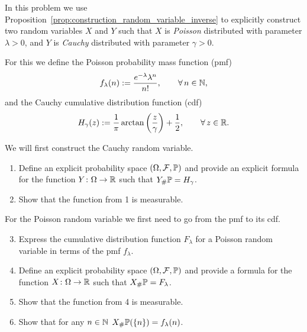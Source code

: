 \begin{problem}
In this problem we use Proposition~\ref{prop:construction_random_variable_inverse} to explicitly construct two random variables $X$ and $Y$ such that $X$ is \emph{Poisson} distributed with parameter $\lambda>0$, and $Y$ is \emph{Cauchy} distributed with parameter $\gamma>0$. 

For this we define the Poisson probability mass function (pmf)
\begin{equation}
	f_\lambda(n) := \frac{e^{-\lambda}\lambda^n}{n!},\qquad \forall\,n\in\mathbb N,
\end{equation}
and the Cauchy cumulative distribution function (cdf)
\begin{equation}
	H_\gamma(z) := \frac{1}{\pi}\arctan\left(\frac{z}{\gamma}\right) + \frac{1}{2},\qquad \forall\,z\in\mathbb R.
\end{equation}

We will first construct the Cauchy random variable.
\begin{enumerate}[label=(\alph*)]
\item Define an explicit probability space $(\Omega, \mathcal F, \mathbb P)$ and provide an explicit formula for the function $Y\colon \Omega\to\mathbb R$ such that $Y_\# \mathbb P = H_\gamma$.
\item Show that the function from 1 is measurable.
\end{enumerate}

For the Poisson random variable we first need to go from the pmf to its cdf.
\begin{enumerate}[label=(\alph*)]
\setcounter{enumi}{2}
\item Express the cumulative distribution function $F_\lambda$ for a Poisson random variable in terms of the pmf $f_\lambda$.
\item Define an explicit probability space $(\Omega, \mathcal F, \mathbb P)$ and provide a formula for the function $X\colon \Omega\to\mathbb R$ such that $X_\# \mathbb P = F_\lambda$.
\item Show that the function from 4 is measurable.
\item Show that for any $n \in \mathbb N$ $X_\# \mathbb P (\{n\}) = f_\lambda(n)$.
\end{enumerate}

\end{problem}

